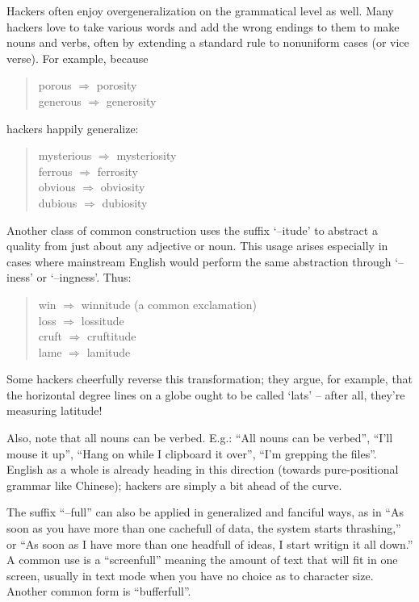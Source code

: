 	Hackers often enjoy overgeneralization on the grammatical level as well.
	Many hackers love to take various words and add the wrong endings to them
	to make nouns and verbs, often by extending a standard rule to nonuniform
	cases (or vice verse). For example, because

	\begin{quote}
		porous $\Rightarrow$ porosity\\
		generous $\Rightarrow$ generosity
	\end{quote}

	hackers happily generalize:

	\begin{quote}
		mysterious $\Rightarrow$ mysteriosity\\
		ferrous $\Rightarrow$ ferrosity\\
		obvious $\Rightarrow$ obviosity\\
		dubious $\Rightarrow$ dubiosity
	\end{quote}

	Another class of common construction uses the suffix `--itude' to abstract
	a quality from just about any adjective or noun. This usage arises
	especially in cases where mainstream English would perform the same
	abstraction through `--iness' or `--ingness'. Thus:

	\begin{quote}
		win $\Rightarrow$ winnitude (a common exclamation)\\
		loss $\Rightarrow$ lossitude\\
		cruft $\Rightarrow$ cruftitude\\
		lame $\Rightarrow$ lamitude
	\end{quote}

	Some hackers cheerfully reverse this transformation; they argue, for
	example, that the horizontal degree lines on a globe ought to be called
	`lats' -- after all, they're measuring latitude!

	Also, note that all nouns can be verbed. E.g.: ``All nouns can be verbed'',
	``I'll mouse it up'',  ``Hang on while I clipboard it over'', ``I'm
	grepping the files''. English as a whole is already heading in this
	direction (towards pure-positional grammar like Chinese); hackers are
	simply a bit ahead of the curve.

	The suffix ``--full'' can also be applied in generalized and fanciful ways,
	as in ``As soon as you have more than one cachefull of data, the system
	starts thrashing,'' or ``As soon as I have more than one headfull of ideas,
	I start writign it all down.'' A common use is a ``screenfull'' meaning the
	amount of text that will fit in one screen, usually in text mode when you
	have no choice as to character size. Another common form is ``bufferfull''.

